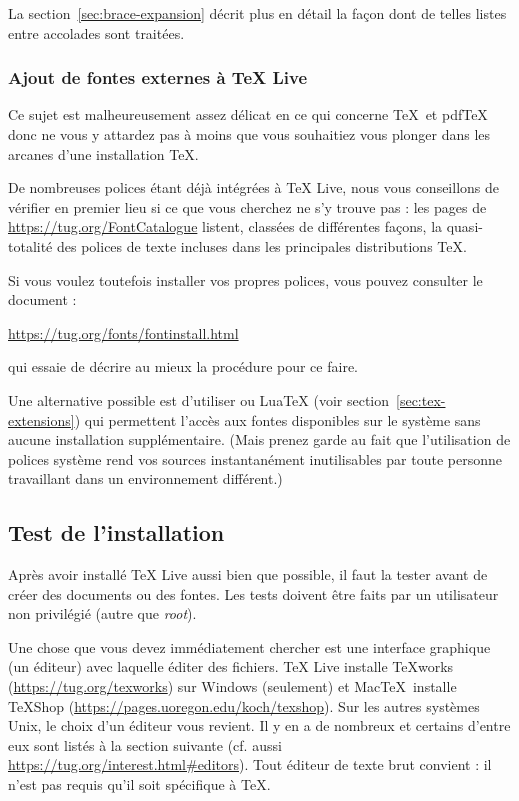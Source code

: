\documentclass[german, english, french, 12pt]{article}
\renewcommand{\TL}{\TeX{} Live\xspace}%
\newcommand\eng[1]{\foreignlanguage{english}{\emph{#1}}}
\begin{document}
La section~\ref{sec:brace-expansion} décrit plus en détail la façon dont de
telles listes entre accolades sont traitées.


\subsubsection{Ajout de fontes externes à \protect\TL{}}

Ce sujet est malheureusement assez délicat en ce qui concerne \TeX\ et pdf\TeX{}
donc ne vous y attardez pas à moins que vous souhaitiez vous plonger dans les
arcanes d'une installation \TeX{}.

De nombreuses polices étant déjà intégrées à \TL, nous vous conseillons de
vérifier en premier lieu si ce que vous cherchez ne s'y trouve pas : les pages
de \url{https://tug.org/FontCatalogue} listent, classées de différentes façons,
la quasi-totalité des polices de texte incluses dans les principales
distributions \TeX.

Si vous voulez toutefois installer vos propres polices, vous pouvez consulter le
document :

\url{https://tug.org/fonts/fontinstall.html}

qui essaie de décrire au mieux la procédure pour ce faire.

Une alternative possible est d'utiliser \XeTeX{} ou Lua\TeX{} (voir
section~\ref{sec:tex-extensions}) qui permettent l'accès aux fontes disponibles
sur le système sans aucune installation supplémentaire. (Mais prenez garde au
fait que l'utilisation de polices système rend vos sources instantanément
inutilisables par toute personne travaillant dans un environnement différent.)

\subsection{Test de l'installation}
\label{sec:test-install}

Après avoir installé \TL{} aussi bien que possible, il faut la tester avant de
créer des documents ou des fontes.  Les tests doivent être faits par un
utilisateur non privilégié (autre que \eng{root}).

Une chose que vous devez immédiatement chercher est une interface graphique (un
éditeur) avec laquelle éditer des fichiers. \TL{} installe \TeX{}works
(\url{https://tug.org/texworks}) sur Windows (seulement) et Mac\TeX\ installe
TeXShop (\url{https://pages.uoregon.edu/koch/texshop}). Sur les autres systèmes
Unix, le choix d'un éditeur vous revient. Il y en a de nombreux et certains
d'entre eux sont listés à la section suivante (cf. aussi
\url{https://tug.org/interest.html#editors}). Tout éditeur de texte brut
convient : il n'est pas requis qu'il soit spécifique à \TeX{}.
\end{document}
